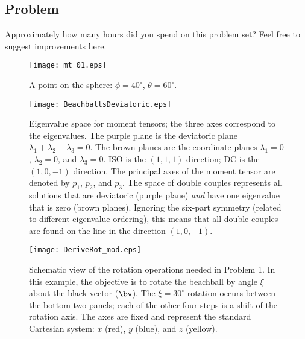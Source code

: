 \documentclass[11pt,titlepage,fleqn]{article}
\newcommand{\rotangB}{\xi}    %
\newcommand{\rotvec}{\bv}      %
\begin{document}
\begin{enumerate}
\begin{enumerate}

\end{enumerate}

\end{enumerate}


\subsection*{Problem}

Approximately how many hours did you spend on this problem set? Feel free to suggest improvements here.




\begin{figure}[h]
\centering
\texttt{[image: mt\_01.eps]}
\caption[]
{{
A point on the sphere: $\phi = 40^\circ$, $\theta = 60^\circ$.
\label{fig:globe}
}}
\end{figure}

\clearpage\pagebreak
\begin{figure}
\centering
\texttt{[image: BeachballsDeviatoric.eps]}
\caption[]
{{
Eigenvalue space for moment tensors; the three axes correspond to the eigenvalues.
The purple plane is the deviatoric plane $\lambda_1 + \lambda_2 + \lambda_3 = 0$.
The brown planes are the coordinate planes $\lambda_1 = 0$, $\lambda_2 = 0$, and $\lambda_3 = 0$.
ISO is the $(1,1,1)$ direction; DC is the $(1,0,-1)$ direction.
The principal axes of the moment tensor are denoted by $p_1$, $p_2$, and $p_3$.
 The space of double couples represents all solutions that are deviatoric (purple plane) {\em and} have one eigenvalue that is zero (brown planes). Ignoring the six-part symmetry (related to different eigenvalue ordering), this means that all double couples are found on the line in the direction $(1,0,-1)$.
\label{fig:lam}
}}
\end{figure}

\clearpage\pagebreak
\begin{figure}
\centering
\texttt{[image: DeriveRot\_mod.eps]}
\caption[]
{{
Schematic view of the rotation operations needed in Problem 1.
In this example, the objective is to rotate the beachball by angle $\rotangB$ about the black vector ($\rotvec$). The $\rotangB = 30^\circ$ rotation occurs between the bottom two panels; each of the other four steps is a shift of the rotation axis. The axes are fixed and represent the standard Cartesian system: $x$ (red), $y$ (blue), and $z$ (yellow).
\label{fig:rot}
}}
\end{figure}
\end{document}
